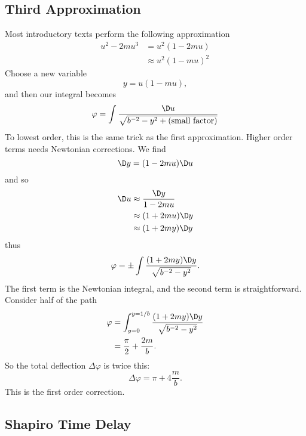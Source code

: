 \subsection{Third Approximation}
Most introductory texts perform the following approximation
\begin{equation}
\begin{split}
u^{2}-2mu^{3}&=u^{2}(1-2mu)\\
&\approx u^{2}(1-mu)^{2}
\end{split}
\end{equation}
Choose a new variable
\begin{equation}
y=u(1-mu),
\end{equation}
and then our integral becomes
\begin{equation}
\varphi=\int\frac{\D u}{\sqrt{b^{-2}-y^{2}+(\mbox{small factor})}}
\end{equation}
To lowest order, this is the same trick as the first
approximation. Higher order terms needs Newtonian corrections. We
find
\begin{equation}
\D y=(1-2mu)\D u
\end{equation}
and so
\begin{subequations}
\begin{align}
\D u
&\approx\frac{\D y}{1-2mu}\\
&\approx(1+2mu)\D y\\
&\approx(1+2my)\D y
\end{align}
\end{subequations}
thus
\begin{equation}
\varphi=\pm\int\frac{(1+2my)\D y}{\sqrt{b^{-2}-y^{2}}}.
\end{equation}
The first term is the Newtonian integral, and the second term is
straightforward. Consider half of the path
\begin{equation}
\begin{split}
\varphi
&=\int^{y=1/b}_{y=0}\frac{(1+2my)\D y}{\sqrt{b^{-2}-y^{2}}}\\
&=\frac{\pi}{2}+\frac{2m}{b}.
\end{split}
\end{equation}
So the total deflection $\Delta\varphi$ is twice this:
\begin{equation}
\Delta\varphi=\pi+4\frac{m}{b}.
\end{equation}
This is the first order correction.

\subsection{Shapiro Time Delay}

